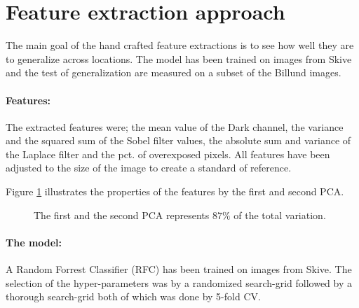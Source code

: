 \documentclass[
    ,title     = {{Methods for image classification}}
    ,longtitle
    ,highlight = dtured
    ,toplogo   = {{template/tex_dtu_compute_b_uk}}
    ,botlogo   = {{template/tex_dtu_frise}}
    ,papersize = {{a0paper}}
    ,colcount  = {{3columns}}
]{dtuposter}
\begin{document}
\begin{minipage}[t]{0.30\textwidth}
\section*{Feature extraction approach}

The main goal of the hand crafted feature extractions is to see how well they are to generalize across locations.
The model has been trained on images from Skive and the test of generalization are measured on a subset of the Billund images.
\paragraph{Features:} The extracted features were; the mean value of the Dark channel, the variance and the squared sum of the Sobel filter values, the absolute sum and variance of the Laplace filter and the pct. of overexposed pixels\footnotemark[1]. 
All features have been adjusted to the size of the image to create a standard of reference.

Figure \ref{fig_rfc_1} illustrates the properties of the features by the first and second PCA.%

\begin{figure}
\centering

\caption{The first and the second PCA represents $87\%$ of the total variation.}
\label{fig_rfc_1}
\end{figure}

\paragraph{The model:} A Random Forrest Classifier (RFC) has been trained on images from Skive. The selection of the hyper-parameters was by a randomized search-grid followed by a thorough search-grid both of which was done by 5-fold CV.

\begin{table}
\centering
{}
\caption{Performance metrics on the independent test partition. All values are in percentage.}
\label{tab_rfc_1}
\end{table}


\end{minipage}
\end{document}
